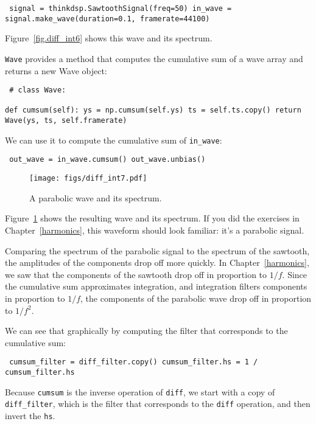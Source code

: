 \documentclass[12pt]{book} \usepackage[width=5.5in,height=8.5in, hmarginratio=3:2,vmarginratio=1:1]{geometry}
\begin{document}
\begin{verbatim} signal = thinkdsp.SawtoothSignal(freq=50) in_wave = signal.make_wave(duration=0.1, framerate=44100) \end{verbatim} 

Figure~\ref{fig.diff_int6} shows this wave and its spectrum. 

{\tt Wave} provides a method that computes the cumulative sum of a wave array and returns a new Wave object: 

\begin{verbatim} # class Wave: 

def cumsum(self): ys = np.cumsum(self.ys) ts = self.ts.copy() return Wave(ys, ts, self.framerate) \end{verbatim} 

We can use it to compute the cumulative sum of \verb"in_wave": 

\begin{verbatim} out_wave = in_wave.cumsum() out_wave.unbias() \end{verbatim} 

\begin{figure} 

\centerline{\texttt{[image: figs/diff\_int7.pdf]}} \caption{A parabolic wave and its spectrum.} \label{fig.diff_int7} \end{figure} 

Figure~\ref{fig.diff_int7} shows the resulting wave and its spectrum. If you did the exercises in Chapter~\ref{harmonics}, this waveform should look familiar: it's a parabolic signal. 

Comparing the spectrum of the parabolic signal to the spectrum of the sawtooth, the amplitudes of the components drop off more quickly. In Chapter~\ref{harmonics}, we saw that the components of the sawtooth drop off in proportion to $1/f$. Since the cumulative sum approximates integration, and integration filters components in proportion to $1/f$, the components of the parabolic wave drop off in proportion to $1/f^2$. 

We can see that graphically by computing the filter that corresponds to the cumulative sum: 

\begin{verbatim} cumsum_filter = diff_filter.copy() cumsum_filter.hs = 1 / cumsum_filter.hs \end{verbatim} 

Because {\tt cumsum} is the inverse operation of {\tt diff}, we start with a copy of \verb"diff_filter", which is the filter that corresponds to the {\tt diff} operation, and then invert the {\tt hs}. 
\end{document}
